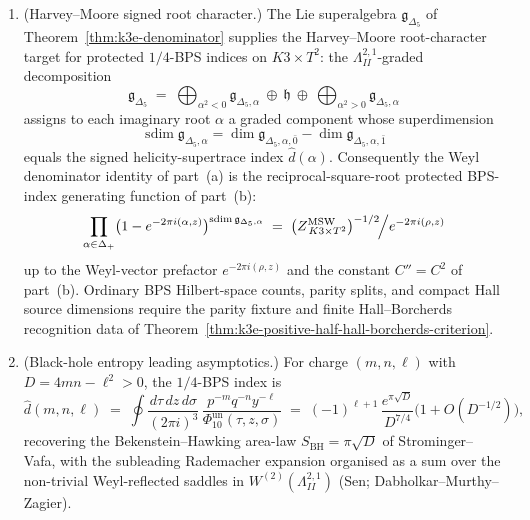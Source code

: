 \begin{theorem}
\begin{enumerate}[label=\textup{(\alph*)}]
\[\]
evaluated at $Z = \bigl(\begin{smallmatrix}\tau & z\\ z & \sigma\end{smallmatrix}\bigr)\in\mathbb{H}_{2}$. In particular $1/\Phi_{10}^{\mathrm{un}}$ is a \emph{genus-$2$} trace of the MSW CFT, \emph{not} a genus-$1$ torus partition function; the genus-$1$ trace of the same CFT is the DMVV second-quantised elliptic genus on $\Sym^{N}(K3)$.
\item \textup{(Harvey--Moore signed root character.)} The Lie superalgebra $\mathfrak{g}_{\Delta_5}$ of Theorem~\ref{thm:k3e-denominator} supplies the Harvey--Moore root-character target for protected $1/4$-BPS indices on $K3\times T^{2}$: the $\Lambda^{2,1}_{II}$-graded decomposition
\[
\mathfrak{g}_{\Delta_5} \;=\; \!\bigoplus_{\alpha^{2} < 0}\mathfrak{g}_{\Delta_5,\alpha}\ \oplus\ \mathfrak{h}\ \oplus\ \bigoplus_{\alpha^{2} > 0}\mathfrak{g}_{\Delta_5,\alpha}
\]
assigns to each imaginary root $\alpha$ a graded component whose superdimension
\[
\operatorname{sdim}\mathfrak{g}_{\Delta_5,\alpha}
=
\dim\mathfrak{g}_{\Delta_5,\alpha,\bar0}
-\dim\mathfrak{g}_{\Delta_5,\alpha,\bar1}
\]
equals the signed helicity-supertrace index $\widehat{d}(\alpha)$. Consequently the Weyl denominator identity of part~(a) is the reciprocal-square-root protected BPS-index generating function of part~(b):
\[
\prod_{\alpha\in\Delta_+}\bigl(1 - e^{-2\pi i(\alpha, z)}\bigr)^{\operatorname{sdim}\mathfrak{g}_{\Delta_5,\alpha}}
\;=\; \bigl(Z^{\mathrm{MSW}}_{\,K3\times T^{2}}\bigr)^{-1/2}\!\Bigl/e^{-2\pi i(\rho, z)}
\]
up to the Weyl-vector prefactor $e^{-2\pi i(\rho, z)}$ and the constant $C'' = C^{2}$ of part~(b). Ordinary BPS Hilbert-space counts, parity splits, and compact Hall source dimensions require the parity fixture and finite Hall--Borcherds recognition data of Theorem~\ref{thm:k3e-positive-half-hall-borcherds-criterion}.
\item \textup{(Black-hole entropy leading asymptotics.)} For charge $(m, n, \ell)$ with $D = 4mn - \ell^{2} > 0$, the $1/4$-BPS index is
\[
\widehat{d}(m, n, \ell) \;=\; \oint \frac{d\tau\,dz\,d\sigma}{(2\pi i)^{3}}\,\frac{p^{-m}q^{-n}y^{-\ell}}{\Phi_{10}^{\mathrm{un}}(\tau, z, \sigma)}
\;=\; (-1)^{\ell + 1}\,\frac{e^{\pi\sqrt{D}}}{D^{7/4}}\bigl(1 + O(D^{-1/2})\bigr),
\]
recovering the Bekenstein--Hawking area-law $S_{\mathrm{BH}} = \pi\sqrt{D}$ of Strominger--Vafa, with the subleading Rademacher expansion organised as a sum over the non-trivial Weyl-reflected saddles in $W^{(2)}(\Lambda^{2,1}_{II})$ (Sen; Dabholkar--Murthy--Zagier).
\end{enumerate}
\end{theorem}

